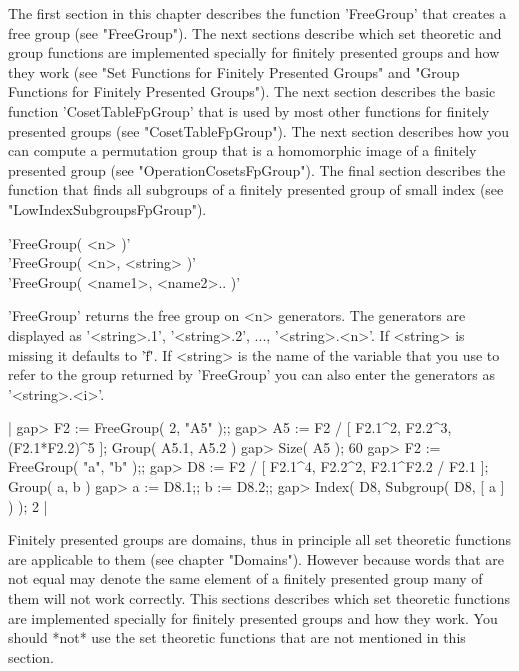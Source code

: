The first section in this chapter describes the function 'FreeGroup' that
creates a free group (see "FreeGroup").  The next sections describe which
set theoretic and group functions are implemented specially  for finitely
presented  groups  and  how they  work  (see "Set  Functions for Finitely
Presented Groups"  and  "Group Functions for Finitely Presented Groups").
The next section describes the basic function 'CosetTableFpGroup' that is
used  by  most   other  functions  for  finitely  presented  groups  (see
"CosetTableFpGroup").  The next section describes how  you can compute  a
permutation  group that is  a  homomorphic image of a finitely  presented
group (see  "OperationCosetsFpGroup").  The final section  describes  the
function that finds all subgroups of  a finitely presented group of small
index (see "LowIndexSubgroupsFpGroup").


'FreeGroup( <n> )' \\
'FreeGroup( <n>, <string> )' \\
'FreeGroup( <name1>, <name2>.. )'

'FreeGroup' returns the free group on <n> generators.  The generators are
displayed   as   '<string>.1',  '<string>.2',  ...,  '<string>.<n>'.   If
<string> is missing it defaults to '\"f\"'.  If <string> is  the name  of
the variable that you use to refer to  the group  returned by 'FreeGroup'
you can also enter the generators as '<string>.<i>'.

|    gap> F2 := FreeGroup( 2, "A5" );;
    gap> A5 := F2 / [ F2.1^2, F2.2^3, (F2.1*F2.2)^5 ];
    Group( A5.1, A5.2 )
    gap> Size( A5 );
    60
    gap> F2 := FreeGroup( "a", "b" );;
    gap> D8 := F2 / [ F2.1^4, F2.2^2, F2.1^F2.2 / F2.1 ];
    Group( a, b )
    gap> a := D8.1;;  b := D8.2;;
    gap> Index( D8, Subgroup( D8, [ a ] ) );
    2 |


Finitely  presented  groups  are  domains,  thus  in  principle  all  set
theoretic  functions  are applicable to  them  (see  chapter  "Domains").
However because words that are not equal may denote the same element of a
finitely presented group  many  of them will  not work  correctly.   This
sections  describes  which   set  theoretic  functions   are  implemented
specially for finitely presented  groups and  how they work.   You should
*not*  use the  set  theoretic functions  that are not mentioned  in this
section.

